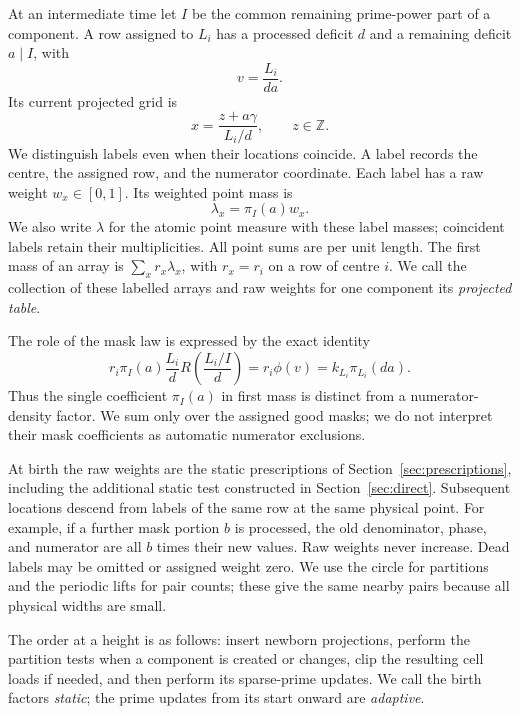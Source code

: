At an intermediate time let $I$ be the common remaining prime-power
part of a component.  A row assigned to $L_i$ has a processed deficit
$d$ and a remaining deficit $a\mid I$, with
\[
 v=\frac{L_i}{da}.
\]
Its current projected grid is
\begin{equation}
 x=\frac{z+a\gamma}{L_i/d},\qquad z\in\mathbb Z.
 \label{tab:projected-grid}
\end{equation}
We distinguish labels even when their locations coincide.  A label
records the centre, the assigned row, and the numerator coordinate.
Each label has a raw weight $w_x\in[0,1]$.  Its weighted point mass is
\[
 \lambda_x=\pi_I(a)w_x.
\]
We also write $\lambda$ for the atomic point measure with these
label masses; coincident labels retain their multiplicities.
All point sums are per unit length.  The first mass of an array is
$\sum_x r_x\lambda_x$, with $r_x=r_i$ on a row of centre $i$.
We call the collection of these labelled arrays and raw weights for
one component its \emph{projected table}.

The role of the mask law is expressed by the exact identity
\begin{equation}
 r_i\pi_I(a)\frac{L_i}{d}
 R\left(\frac{L_i/I}{d}\right)
 =r_i\phi(v)=k_{L_i}\pi_{L_i}(da).
 \label{tab:first-currency}
\end{equation}
Thus the single coefficient $\pi_I(a)$ in first mass is distinct from
a numerator-density factor.  We sum only over the assigned good masks;
we do not interpret their mask coefficients as automatic numerator
exclusions.

At birth the raw weights are the static prescriptions of
Section~\ref{sec:prescriptions}, including the additional static test
constructed in Section~\ref{sec:direct}.  Subsequent locations descend
from labels of the same row at the same physical point.  For example,
if a further mask portion $b$ is processed, the old denominator, phase,
and numerator are all $b$ times their new values.  Raw weights never
increase.  Dead labels may be omitted or assigned weight zero.  We use
the circle for partitions and the periodic lifts for pair counts;
these give the same nearby pairs because all physical widths are small.

The order at a height is as follows: insert newborn projections,
perform the partition tests when a component is created or changes,
clip the resulting cell loads if needed, and then perform its
sparse-prime updates.  We call the birth factors \emph{static}; the
prime updates from its start onward are \emph{adaptive}.

